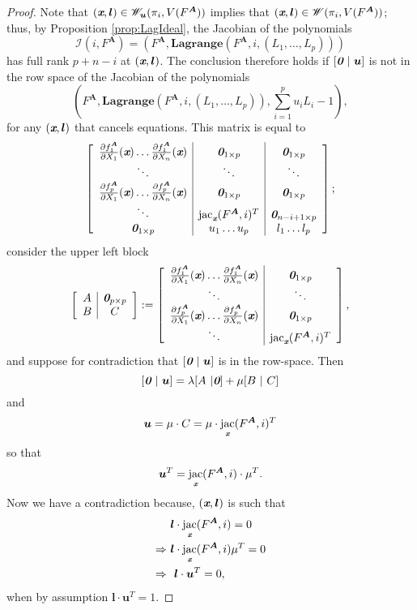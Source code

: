 \documentclass[a4paper]{article}
\def\sI{\mathscr{I}}
\def\bz{\textit{\textbf{0}}}
\def\mA{{\bm A}}
\def\ub{{\bm u}}
\def\lb{{\bm l}}
\def\xb{\textit{\textbf{x}}}
\DeclareMathOperator{\jac}{jac}
\def\pa{\partial}
\def\lagFA{{\bm{Lagrange}}(F^{\mA},i,(L_1,\hdots,L_p))}
\def\udl{\sum_{i=1}^pu_iL_i}
\begin{document}
    \begin{proof}
    Note that $(\xb,\lb)\in\mathscr{W}_{\ub}(\pi_i,V(F^{\mA}))$ implies that $(\xb,\lb)\in\mathscr{W}(\pi_i,V(F^{\mA}))$; thus, by Proposition \ref{prop:LagIdeal}, the Jacobian of the polynomials \[\sI(i,F^{\mA}) = (F^{\mA},\lagFA)\] has full rank $p+n-i$ at $(\xb,\lb)$. The conclusion therefore holds if $[\bz~|~\ub]$ is not in the row space of the Jacobian of the polynomials
    \[
    \left(F^{\mA},\lagFA,\udl -1\right),
    \]
    for any $(\xb,\bm l)$ that cancels equations. This matrix is equal to
    \[
    \left[ 
    \begin{array}{c|c|c}
    \frac{\pa f_1^{\mA}}{\pa X_1}(\xb) \hdots \frac{\pa f_1^{\mA}}{\pa X_n}(\xb) & \bz_{1\times p} & \bz_{1\times p}\\
    \ddots & \ddots & \ddots\\
    \frac{\pa f_p^{\mA}}{\pa X_1}(\xb) \hdots \frac{\pa f_p^{\mA}}{\pa X_n}(\xb) & \bz_{1\times p} & \bz_{1\times p}\\
    \ddots &\jac_{\xb}(F^{\mA},i)^T & \bz_{n-i+1\times p}\\
    \bz_{1 \times p} & u_1 \hdots u_p & l_1 \hdots l_p 
    \end{array}
    \right];
    \]
    consider the upper left block
    \[
    \left[ 
    \begin{array}{c|c}
    A & \bz_{p\times p} \\
    B & C 
    \end{array}
    \right]
    :=
    \left[ 
    \begin{array}{c|c}
    \frac{\pa f_1^{\mA}}{\pa X_1}(\xb) \hdots \frac{\pa f_1^{\mA}}{\pa X_n}(\xb) & \bz_{1\times p} \\
    \ddots & \ddots \\
    \frac{\pa f_p^{\mA}}{\pa X_1}(\xb) \hdots \frac{\pa f_p^{\mA}}{\pa X_n}(\xb) & \bz_{1\times p} \\
    \ddots &\jac_{\xb}(F^{\mA},i)^T
    \end{array}
    \right],
    \]
    and suppose for contradiction that $[\bz~|~\ub]$ is in the row-space. Then 
    \[
    [\bz~|~\ub]
    =
    \lambda [A~|\bz] + \mu[B~|~C]
    \]
    and 
    \[
    \ub = \mu \cdot C = \mu \cdot \jac_{\xb} (F^{\mA},i)^T
    \]
    so that 
    \[
    \ub^T = \jac_{\xb} (F^{\mA},i) \cdot \mu^T.
    \]
    Now we have a contradiction because, $(\xb,\lb)$ is such that 
    \begin{align*}
        &\lb \cdot \jac_{\xb} (F^{\mA},i)=0\\
        \Rightarrow
        ~&\lb \cdot \jac_{\xb} (F^{\mA},i) \mu^T= 0\\
        \Rightarrow
        ~&~\lb \cdot \ub^T = 0,
    \end{align*}
    when by assumption $\lb \cdot \ub^T = 1.$ 
    \end{proof}
\end{document}
